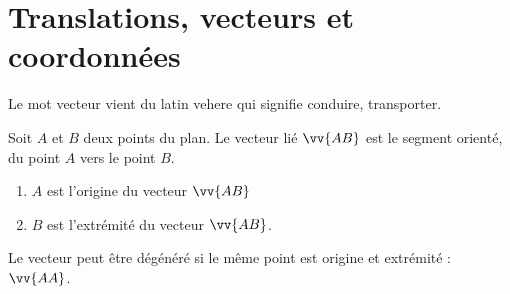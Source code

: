 %	 

\newpage  
\section{Translations, vecteurs et coordonnées}
Le mot \og  vecteur \fg{} vient du latin \og vehere \fg{} qui signifie conduire, transporter.
\begin{definition} Soit $A$ et $B$ deux points du plan.  
	Le vecteur lié  $\vv{AB}$ est le segment orienté, du point $A$ vers le point $B$. 
	\begin{enumerate}[label=\textbullet]
		\item $A$ est l'origine du vecteur  $\vv{AB}$
		\item $B$ est l'extrémité du vecteur   $\vv{AB}$.
	\end{enumerate}
	Le vecteur peut être dégénéré si le même point est origine et extrémité : $\vv{AA}$.
\end{definition}

